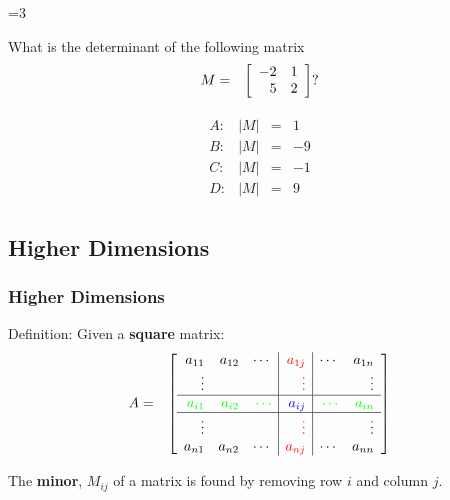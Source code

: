 {\begin{frame}
{          \vfill


     }\fi

      \ifnum\value{clickerQuiz}=3{%
        \vfill
      What is the determinant of the following matrix
        \begin{eqnarray*}
          M & = & \left[ \begin{array}{rr} -2 & 1 \\ 5 & 2 \end{array} \right]?
        \end{eqnarray*}

        \begin{eqnarray*}
          \begin{array}{llcr}
            A: & |M| &  = &  1 \\
            B: & |M| &  = & -9 \\
            C: & |M| &  = &  -1 \\
            D: & |M| &  = & 9
          \end{array}
        \end{eqnarray*}

          \vfill


     }\fi

    \vfill
    \vfill
    \vfill

\end{frame}

}



\subsection{Higher Dimensions}

\begin{frame}
  \frametitle{Higher Dimensions}

  Definition: Given a \textbf{square} matrix:
  \begin{eqnarray*}
    A & = &
    \left[
      \begin{array}{rrr|r|rr}
        a_{11} & a_{12} & \cdots & {\color{red}a_{1j}}  & \cdots & a_{1n} \\
        \vdots &       &       & {\color{red}\vdots} &        & \vdots \\ \hline
        {\color{green}a_{i1}} & {\color{green}a_{i2}}  & {\color{green}\cdots} & {\color{blue}a_{ij}} & {\color{green}\cdots} & {\color{green}a_{in}} \\ \hline
        \vdots &       &       & {\color{red}\vdots} &        & \vdots \\
        a_{n1} & a_{n2} & \cdots & {\color{red}a_{nj}}  & \cdots & a_{nn} \\
      \end{array}
    \right]
  \end{eqnarray*}

  The \textbf{minor}, $M_{ij}$ of a matrix is found by removing row
  $i$ and column $j$.

\end{frame}


